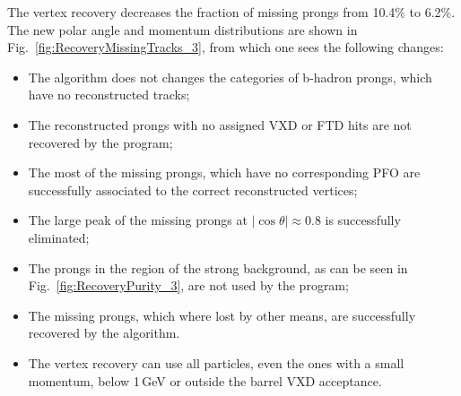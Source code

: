 The vertex recovery decreases the fraction of missing prongs from 10.4\% to 6.2\%. The new polar angle and momentum distributions are shown in Fig.~\ref{fig:RecoveryMissingTracks_3}, from which one sees the following changes:
\begin{itemize}
\item The algorithm does not changes the categories of b-hadron prongs, which have no reconstructed tracks;
\item The reconstructed prongs with no assigned VXD or FTD hits are not recovered by the program;
\item The most of the missing prongs, which have no corresponding PFO are successfully associated to the correct reconstructed vertices;
\item The large peak of the missing prongs at $|\cos\theta| \approx 0.8$ is successfully eliminated;
\item The prongs in the region of the strong background, as can be seen in Fig.~\ref{fig:RecoveryPurity_3}, are not used by the program;
\item The missing prongs, which where lost by other means, are successfully recovered by the algorithm.
\item The vertex recovery can use all particles, even the ones with a small momentum, below 1\,GeV or outside the barrel VXD acceptance. 
\end{itemize}


